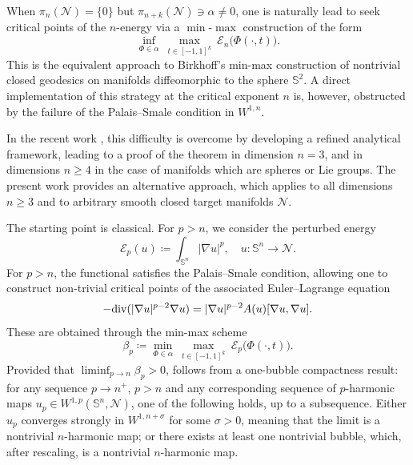 \documentclass[12pt]{amsart}
\def\n{{\mathcal M}}
\def\n{{\mathcal{M}}}
\def\n{{\mathcal N}}
\def\S{{\mathbb S}}
\renewcommand{\div}{{\rm div}}
\numberwithin{theorem}{section} \numberwithin{equation}{section}
\begin{document}
When $\pi_{n}(\n)= \{0\}$ but $\pi_{n+k}(\n) \ni \alpha \neq 0$, one is naturally lead to seek critical points of the $n$-energy via a $\min$-$\max$ construction of the form
\[
 \inf_{\Phi \in \alpha}\ \max_{t\in [-1,1]^k}\ \mathcal{E}_n\big( \Phi(\cdot,t) \big).
\]
This is the equivalent approach to Birkhoff's min-max construction of nontrivial closed geodesics on manifolds diffeomorphic to the sphere $\S^2$. A direct implementation of this strategy at the critical exponent $n$ is, however, obstructed by the failure of the Palais--Smale condition in $W^{1,n}$.

In the recent work \cite{DML25}, this difficulty is overcome by developing a refined analytical framework, leading to a proof of the theorem  in dimension $n=3$, and in dimensions $n\geq 4$ in the case of manifolds which are spheres or Lie groups. The present work provides an alternative approach, which applies to all dimensions $n\ge3$ and to arbitrary smooth closed target manifolds $\n$.

The starting point is classical. For $p > n$, we consider the perturbed energy
\[
 \mathcal{E}_p(u) \coloneqq \int_{\S^n} |\nabla u|^p, \quad  u\colon \S^n \to \n.
\]
For $p>n$, the functional satisfies the Palais--Smale condition, allowing one to construct non-trivial critical points of the associated Euler--Lagrange equation
\begin{equation}\label{eq:pharmonic}
 -\div(|\nabla u|^{p-2} \nabla u) = |\nabla u|^{p-2} A(u)[\nabla u,\nabla u].
\end{equation}
These are obtained through the min-max scheme
\[
 \beta_p \coloneqq \min_{\Phi \in \alpha}\ \max_{ t\in [-1,1]^k}\ \mathcal{E}_p \big(\Phi(\cdot,t) \big).
\]
Provided that $\liminf_{p \to n} \beta_p > 0$,  follows  from a one-bubble compactness result: for any sequence $p \to n^+$, $p>n$ and any corresponding sequence of $p$-harmonic maps $u_p \in W^{1,p}(\S^n,\n)$, one of the following holds, up to a subsequence. Either $u_p$ converges strongly in $W^{1,n+\sigma}$  for some $\sigma > 0$, meaning that the limit is a nontrivial $n$-harmonic map; or there exists at least one nontrivial bubble, which, after rescaling, is a nontrivial $n$-harmonic map.
\end{document}
